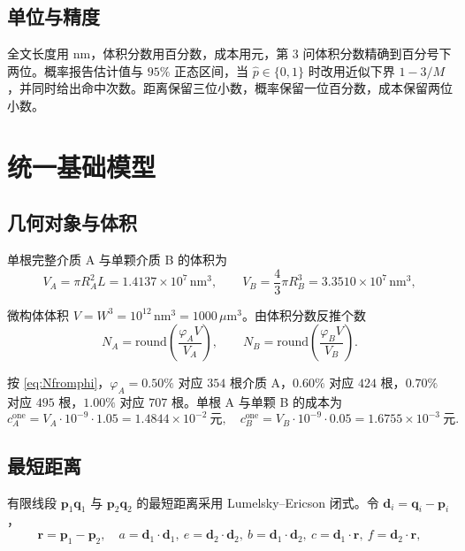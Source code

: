 \documentclass[UTF8,a4paper,zihao=-4,fontset=none]{ctexart}
\begin{document}
\subsection{单位与精度}

全文长度用 $\mathrm{nm}$，体积分数用百分数，成本用元，第 3 问体积分数精确到百分号下两位。概率报告估计值与 $95\%$ 正态区间，当 $\hat p\in\{0,1\}$ 时改用近似下界 $1-3/M$，并同时给出命中次数。距离保留三位小数，概率保留一位百分数，成本保留两位小数。

\section{统一基础模型}

\subsection{几何对象与体积}

单根完整介质 A 与单颗介质 B 的体积为
\begin{equation}
V_A=\pi R_A^2 L=1.4137\times 10^{7}\,\mathrm{nm}^3,
\qquad
V_B=\frac{4}{3}\pi R_B^3=3.3510\times 10^{7}\,\mathrm{nm}^3,
\end{equation}

微构体体积 $V=W^3=10^{12}\,\mathrm{nm}^3=1000\,\mu\mathrm{m}^3$。由体积分数反推个数
\begin{equation}
N_A=\mathrm{round}\!\left(\frac{\varphi_A V}{V_A}\right),
\qquad
N_B=\mathrm{round}\!\left(\frac{\varphi_B V}{V_B}\right).
\label{eq:Nfromphi}
\end{equation}

按 \eqref{eq:Nfromphi}，$\varphi_A=0.50\%$ 对应 $354$ 根介质 A，$0.60\%$ 对应 $424$ 根，$0.70\%$ 对应 $495$ 根，$1.00\%$ 对应 $707$ 根。单根 A 与单颗 B 的成本为
\begin{equation}
c_A^{\mathrm{one}}=V_A\cdot 10^{-9}\cdot 1.05=1.4844\times 10^{-2}\ \text{元},
\quad
c_B^{\mathrm{one}}=V_B\cdot 10^{-9}\cdot 0.05=1.6755\times 10^{-3}\ \text{元}.
\end{equation}

\subsection{最短距离}

有限线段 $\boldsymbol{p}_1\boldsymbol{q}_1$ 与 $\boldsymbol{p}_2\boldsymbol{q}_2$ 的最短距离采用 Lumelsky--Ericson 闭式。令 $\boldsymbol{d}_i=\boldsymbol{q}_i-\boldsymbol{p}_i$，
\[
\boldsymbol{r}=\boldsymbol{p}_1-\boldsymbol{p}_2,\quad
a=\boldsymbol{d}_1\cdot\boldsymbol{d}_1,\
e=\boldsymbol{d}_2\cdot\boldsymbol{d}_2,\
b=\boldsymbol{d}_1\cdot\boldsymbol{d}_2,\
c=\boldsymbol{d}_1\cdot\boldsymbol{r},\
f=\boldsymbol{d}_2\cdot\boldsymbol{r},
\]
\end{document}
